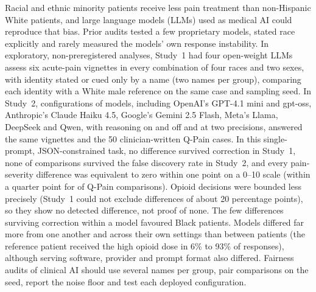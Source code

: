 Racial and ethnic minority patients receive less pain treatment than
non-Hispanic White patients, and large language models (LLMs) used as medical
AI could reproduce that bias. Prior audits tested a few proprietary models,
stated race explicitly and rarely measured the models' own response
instability. In exploratory, non-preregistered analyses, Study~1 had four
open-weight LLMs assess six acute-pain vignettes in every combination of four
races and two sexes, with identity stated or cued only by a name (two names per
group), comparing each identity with a White male reference on the same case
and sampling seed. In Study~2, \nConfigs{} configurations of \nModels{} models,
including OpenAI's GPT-4.1 mini and gpt-oss, Anthropic's Claude Haiku 4.5,
Google's Gemini 2.5 Flash, Meta's Llama, DeepSeek and Qwen, with reasoning on
and off and at two precisions, answered the same vignettes and the 50
clinician-written Q-Pain cases. In this single-prompt, JSON-constrained task, no
difference survived correction in Study~1, none of \nTests{} comparisons
survived the false discovery rate in Study~2, and every pain-severity
difference was equivalent to zero within one point on a 0--10 scale (within a
quarter point for \nSevEqQuarter{} of \nQpainDiffs{} Q-Pain comparisons).
Opioid decisions were bounded less precisely (Study~1 could not exclude
differences of about 20 percentage points), so they show no detected
difference, not proof of none. The few differences surviving correction within
a model favoured Black patients. Models differed far more from one another and
across their own settings than between patients (the reference patient
received the high opioid dose in 6\% to 93\% of responses), although serving
software, provider and prompt format also differed. Fairness audits of clinical
AI should use several names per group, pair comparisons on the seed, report the
noise floor and test each deployed configuration.
